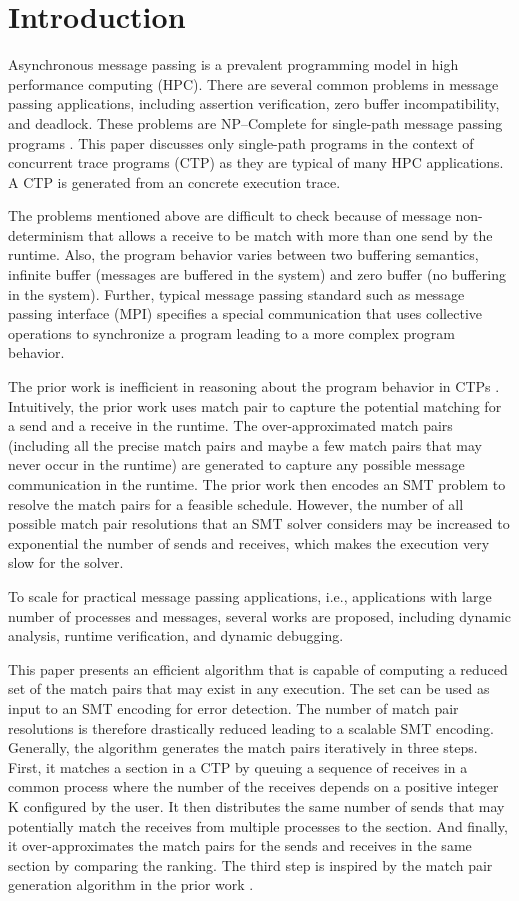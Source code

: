 \section{Introduction}
Asynchronous message passing is a prevalent programming model in high performance computing (HPC). There are several common problems in message passing applications, including assertion verification, zero buffer incompatibility, and deadlock. These problems are NP--Complete for single-path message passing programs \cite{}. This paper discusses only single-path programs in the context of concurrent trace programs (CTP) as they are typical of many HPC applications. A CTP is generated from an concrete execution trace.

The problems mentioned above are difficult to check because of message non-determinism that allows a receive to be match with more than one send by the runtime. Also, the program behavior varies between two buffering semantics, infinite buffer (messages are buffered in the system) and zero buffer (no buffering in the system). Further, typical message passing standard such as message passing interface (MPI) specifies a special communication that uses collective operations to synchronize a program leading to a more complex program behavior. 

The prior work is inefficient in reasoning about the program behavior in CTPs \cite{}.   
Intuitively, the prior work uses match pair to capture the potential matching for a send and a receive in the runtime. 
The over-approximated match pairs (including all the precise match pairs and maybe a few match pairs that may never occur in the runtime) are generated to capture any possible message communication in the runtime. 
The prior work then encodes an SMT problem to resolve the match pairs for a feasible schedule. However, the number of all possible match pair resolutions that an SMT solver considers may be increased to exponential the number of sends and receives, which makes the execution very slow for the solver.  


To scale for practical message passing applications, i.e., applications with large number of processes and messages, several works are proposed, including dynamic analysis, runtime verification, and dynamic debugging.

This paper presents an efficient algorithm that is capable of computing a reduced set of the match pairs that may exist in any execution. The set can be used as input to an SMT encoding for error detection. The number of match pair resolutions is therefore drastically reduced leading to a scalable SMT encoding. Generally, the algorithm generates the match pairs iteratively in three steps. First, it matches a section in a CTP by queuing a sequence of receives in a common process where the number of the receives depends on a positive integer K configured by the user. It then distributes the same number of sends that may potentially match the receives from multiple processes to the section. And finally, it over-approximates the match pairs for the sends and receives in the same section by comparing the ranking. The third step is inspired by the match pair generation algorithm in the prior work \cite{}. 


